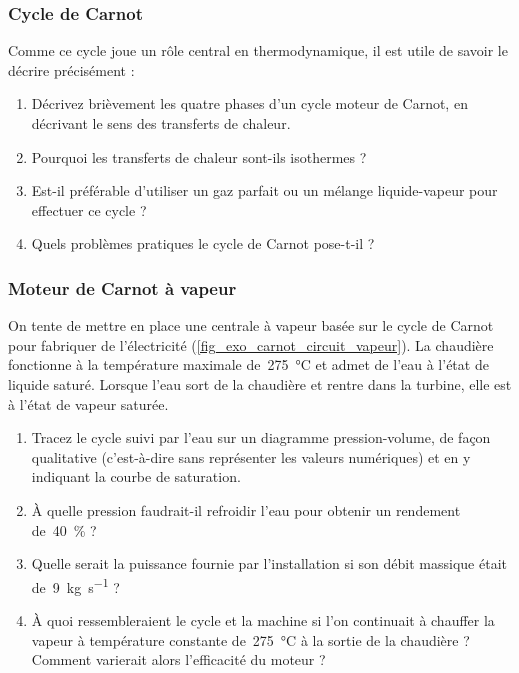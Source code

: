 \subsubsection{Cycle de Carnot}
\label{exo_cours_carnot}

	Comme ce cycle joue un rôle central en thermodynamique, il est utile de savoir le décrire précisément :
	
	\begin{enumerate}
	
		\item Décrivez brièvement les quatre phases d’un cycle moteur de Carnot, en décrivant le sens des transferts de chaleur.
	
		\item Pourquoi les transferts de chaleur sont-ils isothermes ?
		
		\item Est-il préférable d’utiliser un gaz parfait ou un mélange liquide-vapeur pour effectuer ce cycle ?
		
		\item Quels problèmes pratiques le cycle de Carnot pose-t-il ?

	\end{enumerate}


\subsubsection{Moteur de Carnot à vapeur}
\label{exo_moteur_carnot_vapeur}

	On tente de mettre en place une centrale à vapeur basée sur le cycle de Carnot pour fabriquer de l’électricité (\cref{fig_exo_carnot_circuit_vapeur}). La chaudière fonctionne à la température maximale de~\SI{275}{\degreeCelsius} et admet de l’eau à l’état de liquide saturé. Lorsque l’eau sort de la chaudière et rentre dans la turbine, elle est à l’état de vapeur saturée.
	
	\begin{enumerate}
	
		\item Tracez le cycle suivi par l’eau sur un diagramme pression-volume, de façon qualitative (c’est-à-dire sans représenter les valeurs numériques) et en y indiquant la courbe de saturation.
		
		\item À quelle pression faudrait-il refroidir l’eau pour obtenir un rendement de~\SI{40}{\percent} ?
		
		\item Quelle serait la puissance fournie par l’installation si son débit massique était de~\SI{9}{\kilogram\per\second} ?
		
		\item À quoi ressembleraient le cycle et la machine si l’on continuait à chauffer la vapeur à température constante de~\SI{275}{\degreeCelsius} à la sortie de la chaudière ? Comment varierait alors l’efficacité du moteur ?
		
	\end{enumerate}

